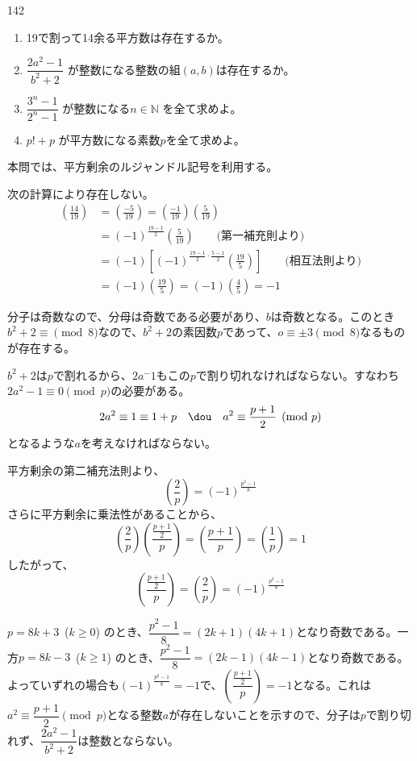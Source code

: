 \begin{prob}{142}{}{}
 \begin{enumerate}
  \item 19で割って14余る平方数は存在するか。 
  \item $\dfrac{2a^2-1}{b^2+2}$ が整数になる整数の組$(a,b)$は存在するか。 
  \item $\dfrac{3^n-1}{2^n-1}$ が整数になる$n\in\mathbb{N}$ を全て求めよ。 
  \item $p!+p$ が平方数になる素数$p$を全て求めよ。 
 \end{enumerate}
\end{prob}
本問では、平方剰余のルジャンドル記号を利用する。

次の計算により存在しない。
\begin{align*}
 \left(\frac{14}{19}\right) &= \left(\frac{-5}{19}\right) = \left(\frac{-1}{19}\right)\left(\frac{5}{19}\right) \\
 &= (-1)^{\frac{19-1}{2}}\left(\frac{5}{19}\right) \quad\quad\text{(第一補充則より)} \\
 &= (-1)\left[(-1)^{\frac{19-1}{2}\cdot\frac{5-1}{2}}\left(\frac{19}{5}\right)\right] \quad\quad\text{(相互法則より)} \\
 &=(-1)\left(\frac{19}{5}\right) = (-1)\left(\frac{4}{5}\right) = -1
\end{align*}

分子は奇数なので、分母は奇数である必要があり、$b$は奇数となる。このとき$b^2+2\equiv\pmod{8}$なので、$b^2+2$の素因数$p$であって、$o\equiv\pm 3 \pmod{8}$なるものが存在する。

$b^2+2$は$p$で割れるから、$2a^-1$もこの$p$で割り切れなければならない。すなわち$2a^2-1\equiv 0\pmod{p}$の必要がある。
\[ 2a^2\equiv 1\equiv 1+p \quad\dou\quad a^2\equiv \frac{p+1}{2} \pmod{p} \]
となるような$a$を考えなければならない。

平方剰余の第二補充法則より、
\[ \left(\frac{2}{p}\right)=\left(-1\right)^{\frac{p^2-1}{8}} \]
さらに平方剰余に乗法性があることから、
\[ \left(\frac{2}{p}\right)\left(\frac{\frac{p+1}{2}}{p}\right)=\left(\frac{p+1}{p}\right)=\left(\frac{1}{p}\right)=1 \]
したがって、
\[ \left(\frac{\frac{p+1}{2}}{p}\right)=\left(\frac{2}{p}\right)=\left(-1\right)^{\frac{p^2-1}{8}} \]

$p=8k+3$~($k\ge 0$) のとき、$\dfrac{p^2-1}{8}=(2k+1)(4k+1)$となり奇数である。一方$p=8k-3$~($k\ge 1$) のとき、$\dfrac{p^2-1}{8}=(2k-1)(4k-1)$となり奇数である。よっていずれの場合も$\left(-1\right)^\frac{p^2-1}{8}=-1$で、$\left(\dfrac{\frac{p+1}{2}}{p}\right)=-1$となる。これは$a^2\equiv \dfrac{p+1}{2} \pmod{p}$となる整数$a$が存在しないことを示すので、分子は$p$で割り切れず、$\dfrac{2a^2-1}{b^2+2}$は整数とならない。

